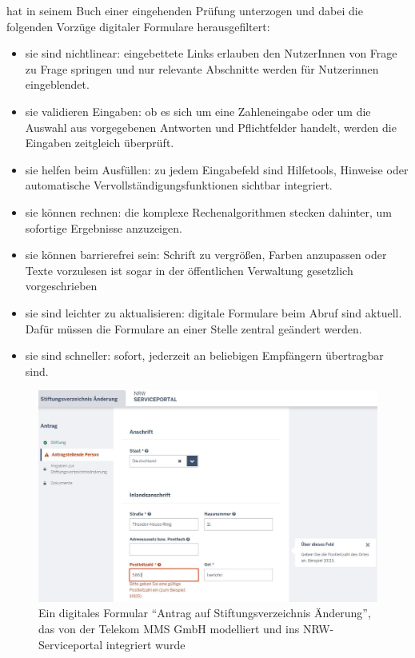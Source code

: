 \cite{formulare_schwesinger_2007} hat in seinem Buch einer eingehenden Prüfung unterzogen und dabei die folgenden Vorzüge digitaler Formulare herausgefiltert:
\begin{itemize}
    \item sie sind nichtlinear: eingebettete Links erlauben den NutzerInnen von Frage zu Frage springen und nur relevante Abschnitte werden für Nutzerinnen eingeblendet.
    \item sie validieren Eingaben: ob es sich um eine Zahleneingabe oder um die Auswahl aus vorgegebenen Antworten und Pflichtfelder handelt, werden die Eingaben zeitgleich überprüft.
    \item sie helfen beim Ausfüllen: zu jedem Eingabefeld sind Hilfetools, Hinweise oder automatische Vervollständigungsfunktionen sichtbar integriert.
    \item sie können rechnen: die komplexe Rechenalgorithmen stecken dahinter, um sofortige Ergebnisse anzuzeigen.
    \item sie können barrierefrei sein: Schrift zu vergrößen, Farben anzupassen oder Texte vorzulesen ist sogar in der öffentlichen Verwaltung gesetzlich vorgeschrieben
    \item sie sind leichter zu aktualisieren: digitale Formulare beim Abruf sind aktuell. Dafür müssen die Formulare an einer Stelle zentral geändert werden.
    \item sie sind schneller: sofort, jederzeit an beliebigen Empfängern übertragbar sind.
\end{itemize}


\begin{figure}[ht]
  \centering
  \includegraphics[width=\linewidth]{images/form_adresse.JPG}
  \caption{Ein digitales Formular ``Antrag auf Stiftungsverzeichnis Änderung'', das von der Telekom MMS GmbH modelliert und ins NRW-Serviceportal integriert wurde}
  \label{fig:meineabbildung}
\end{figure}

